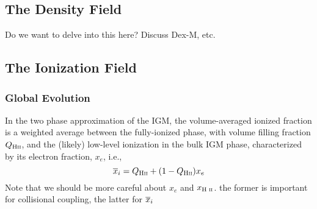

\subsection{The Density Field}
{\color{red} Do we want to delve into this here? Discuss Dex-M, etc.}

\subsection{The Ionization Field}

\subsubsection{Global Evolution} \label{sec:ionization_global}
In the two phase approximation of the IGM, the volume-averaged ionized fraction is a weighted average between the fully-ionized phase, with volume filling fraction $Q_{\text{H} {\textsc{ii}}}$, and the (likely) low-level ionization in the bulk IGM phase, characterized by its electron fraction, $x_e$, i.e.,
\begin{equation}
	\overline{x}_i = Q_{\text{H} {\textsc{ii}}} + (1 - Q_{\text{H} {\textsc{ii}}}) x_e
\end{equation}
{\color{red} Note that we should be more careful about $x_e$ and $x_{\text{H } \textsc{ii}}$. the former is important for collisional coupling, the latter for $\overline{x}_i$} 

